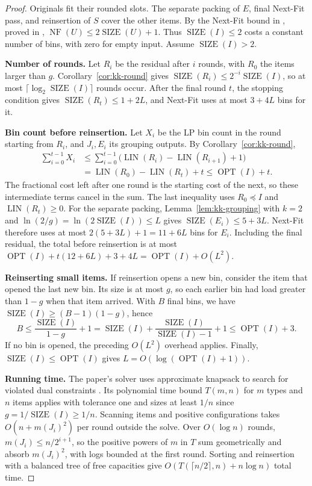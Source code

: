\documentclass[11pt,a4paper,onecolumn]{article}
\theoremstyle{plain}
\theoremstyle{definition}
\theoremstyle{remark}
\DeclareMathOperator{\OPT}{OPT}
\DeclareMathOperator{\SIZE}{SIZE}
\DeclareMathOperator{\LIN}{LIN}
\DeclareMathOperator{\NF}{NF}
\begin{document}
\begin{proof}
Originals fit their rounded slots. The separate packing of $E$,
final Next-Fit pass, and reinsertion of $S$ cover the other items.
By the Next-Fit bound in , proved in
, $\NF(U)\le2\SIZE(U)+1$.
Thus $\SIZE(I)\le2$ costs a constant number of bins, with zero for empty input.
Assume $\SIZE(I)>2$.

\smallskip\noindent\textbf{Number of rounds.}
Let $R_i$ be the residual after $i$ rounds, with $R_0$ the items
larger than $g$. Corollary~\ref{cor:kk-round} gives
$\SIZE(R_i)\le 2^{-i}\SIZE(I)$, so at most $\lceil\log_2 \SIZE(I)\rceil$ rounds
occur. After the final round $t$, the stopping condition gives
$\SIZE(R_t)\le 1+2L$, and Next-Fit uses at most $3+4L$ bins for it.

\smallskip\noindent\textbf{Bin count before reinsertion.}
Let $X_i$ be the LP bin count in the round starting from $R_i$,
and $J_i,E_i$ its grouping outputs. By Corollary~\ref{cor:kk-round},
\begin{align*}
  \sum_{i=0}^{t-1} X_i
  &\le \sum_{i=0}^{t-1} \bigl(\LIN(R_i)-\LIN(R_{i+1})+1\bigr)\\
  &= \LIN(R_0)-\LIN(R_t)+t\le\OPT(I)+t .
\end{align*}
The fractional cost left after one round is the starting cost of
the next, so these intermediate terms cancel in the sum.
The last inequality uses $R_0\preceq I$ and $\LIN(R_t)\ge0$.
For the separate packing, Lemma~\ref{lem:kk-grouping} with $k=2$ and
$\ln(2/g)=\ln(2\SIZE(I))\le L$ gives $\SIZE(E_i)\le5+3L$. Next-Fit
therefore uses at most $2(5 + 3L) + 1 = 11+6L$ bins for $E_i$. Including the final
residual, the total before reinsertion is at most
$\OPT(I)+t(12+6L)+3+4L=\OPT(I)+O(L^2)$.

\smallskip\noindent\textbf{Reinserting small items.}
If reinsertion opens a new bin, consider the item that opened the last
new bin. Its size is at most $g$, so each earlier bin had load
greater than $1-g$ when that item arrived. With $B$ final bins,
we have $\SIZE(I)\ge (B-1)(1-g)$, hence
\[
    B\le\frac{\SIZE(I)}{1-g}+1
    =\SIZE(I)+\frac{\SIZE(I)}{\SIZE(I)-1}+1
    \le\OPT(I)+3.
\]
If no bin is opened, the preceding $O(L^2)$ overhead applies.
Finally, $\SIZE(I)\le\OPT(I)$ gives $L=O(\log(\OPT(I)+1))$.

\smallskip\noindent\textbf{Running time.}
The paper's solver uses approximate knapsack to search for violated
dual constraints \cite[Section~6]{karmarkarEfficientApproximationScheme1982}.
Its polynomial time bound $T(m,n)$ for $m$ types and $n$ items
applies with tolerance one and sizes at least $1/n$ since
$g=1/\SIZE(I)\ge1/n$. Scanning items and positive configurations takes
$O(n+m(J_i)^2)$ per round outside the solve. Over $O(\log n)$ rounds,
$m(J_i)\le n/2^{i+1}$, so the positive powers of $m$ in $T$ sum
geometrically and absorb $m(J_i)^2$, with logs bounded at the first
round. Sorting and reinsertion with a balanced tree of free
capacities give $O(T(\lceil n/2\rceil,n)+n\log n)$ total time.
\end{proof}
\end{document}
